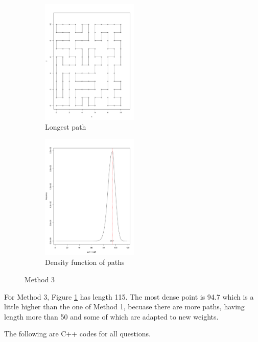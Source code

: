 \documentclass[11pt,english]{article}
\newcommand{\reffig}[1]{Figure \ref{#1}\hspace{2pt}}
\begin{document}
\begin{figure}[H]
	\centering
	\begin{subfigure}[b]{0.475\textwidth}
		\centering
		\includegraphics[width=\textwidth, height=6cm]{p2_3_5_115.pdf}
		\caption{Longest path}\label{p2_3_5_115}
	\end{subfigure}
	\quad
	\begin{subfigure}[b]{0.475\textwidth}
		\centering
		\includegraphics[width=\textwidth, height=6cm]{p2_3_6.pdf}
		\caption{Density function of paths}\label{p2_3_6}
	\end{subfigure}
	\caption{Method 3}
\end{figure}

For Method 3, \reffig{p2_3_5_115} has length 115. The most dense point is 94.7 which is a little higher than the one of Method 1, becuase there are more paths, having length more than 50 and some of which are adapted to new weights.
	
The following are C++ codes for all questions.
	
	
\end{document}
